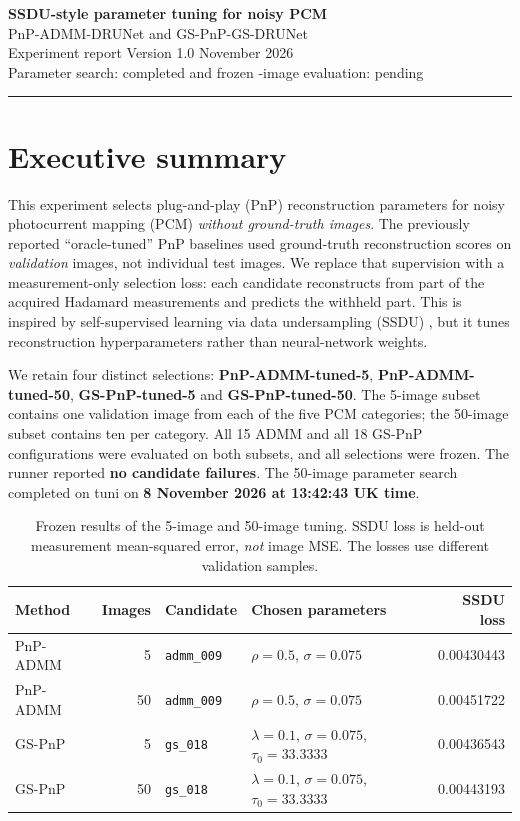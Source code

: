 \documentclass[a4paper,10pt]{article}
\begin{document}
\vspace*{0.25em}
{\LARGE\bfseries\color{main} SSDU-style parameter tuning for noisy PCM}\\[4pt]
{\large PnP-ADMM-DRUNet and GS-PnP-GS-DRUNet}\\[6pt]
{\color{muted} Experiment report \quad Version 1.0  November 2026}\\[2pt]
{\color{muted} Parameter search: completed and frozen -image evaluation: pending}
\vspace{0.2cm}\hrule

\section{Executive summary}

This experiment selects plug-and-play (PnP) reconstruction parameters for noisy photocurrent mapping (PCM) \emph{without ground-truth images}. The previously reported ``oracle-tuned'' PnP baselines used ground-truth reconstruction scores on \emph{validation} images, not individual test images. We replace that supervision with a measurement-only selection loss: each candidate reconstructs from part of the acquired Hadamard measurements and predicts the withheld part. This is inspired by self-supervised learning via data undersampling (SSDU) \cite{yaman2020}, but it tunes reconstruction hyperparameters rather than neural-network weights.

We retain four distinct selections: \textbf{PnP-ADMM-tuned-5}, \textbf{PnP-ADMM-tuned-50}, \textbf{GS-PnP-tuned-5} and \textbf{GS-PnP-tuned-50}. The 5-image subset contains one validation image from each of the five PCM categories; the 50-image subset contains ten per category. All 15 ADMM and all 18 GS-PnP configurations were evaluated on both subsets, and all selections were frozen. The runner reported \textbf{no candidate failures}. The 50-image parameter search completed on tuni on \textbf{8 November 2026 at 13:42:43 UK time}.

\begin{table}[H]
\centering\small
\begin{tabularx}{\linewidth}{@{}lrlXr@{}}
\toprule
\textbf{Method} & \textbf{Images} & \textbf{Candidate} & \textbf{Chosen parameters} & \textbf{SSDU loss} \\
\midrule
PnP-ADMM & 5 & \texttt{admm\_009} & $\rho=0.5$, $\sigma=0.075$ & 0.00430443 \\
PnP-ADMM & 50 & \texttt{admm\_009} & $\rho=0.5$, $\sigma=0.075$ & 0.00451722 \\
GS-PnP & 5 & \texttt{gs\_018} & $\lambda=0.1$, $\sigma=0.075$, $\tau_0=33.3333$ & 0.00436543 \\
GS-PnP & 50 & \texttt{gs\_018} & $\lambda=0.1$, $\sigma=0.075$, $\tau_0=33.3333$ & 0.00443193 \\
\bottomrule
\end{tabularx}
\caption{Frozen results of the 5-image and 50-image tuning. SSDU loss is held-out measurement mean-squared error, \emph{not} image MSE. The losses use different validation samples.}
\label{tab:winners}
\end{table}
\end{document}
